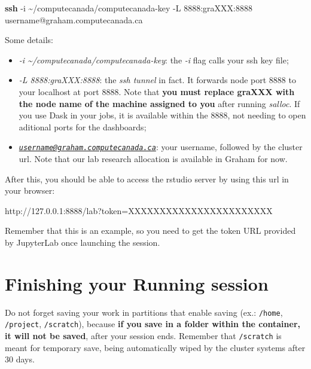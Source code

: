 \documentclass[
]{book}
\newenvironment{Shaded}{\begin{snugshade}}{\end{snugshade}}
\newcommand{\AttributeTok}[1]{\textcolor[rgb]{0.13,0.29,0.53}{#1}}
\newcommand{\ExtensionTok}[1]{#1}
\newcommand{\FunctionTok}[1]{\textcolor[rgb]{0.13,0.29,0.53}{\textbf{#1}}}
\newcommand{\NormalTok}[1]{#1}
\providecommand{\tightlist}{%
  \setlength{\itemsep}{0pt}\setlength{\parskip}{0pt}}
\begin{document}
\begin{Shaded}
\begin{Highlighting}[]
\FunctionTok{ssh} \AttributeTok{{-}i}\NormalTok{ \textasciitilde{}/computecanada/computecanada{-}key }\AttributeTok{{-}L}\NormalTok{ 8888:graXXX:8888 username@graham.computecanada.ca}
\end{Highlighting}
\end{Shaded}

Some details:

\begin{itemize}
\tightlist
\item
  \emph{-i \textasciitilde/computecanada/computecanada-key}: the \emph{-i} flag calls your ssh key file;
\item
  \emph{-L 8888:graXXX:8888}: the \emph{ssh tunnel} in fact. It forwards node port 8888 to your localhost at port 8888. Note that \textbf{you must replace graXXX with the node name of the machine assigned to you} after running \emph{salloc}. If you use Dask in your jobs, it is available within the 8888, not needing to open aditional ports for the dashboards;
\item
  \emph{\href{mailto:username@graham.computecanada.ca}{\nolinkurl{username@graham.computecanada.ca}}}: your username, followed by the cluster url. Note that our lab research allocation is available in Graham for now.
\end{itemize}

After this, you should be able to access the rstudio server by using this url
in your browser:

\begin{Shaded}
\begin{Highlighting}[]
\ExtensionTok{http://127.0.0.1:8888/lab?token=XXXXXXXXXXXXXXXXXXXXXXX}
\end{Highlighting}
\end{Shaded}

Remember that this is an example, so you need to get the token URL provided by JupyterLab once launching the session.

\hypertarget{finishing-your-running-session-1}{%
\section{Finishing your Running session}\label{finishing-your-running-session-1}}

Do not forget saving your work in partitions that enable saving (ex.: \texttt{/home}, \texttt{/project}, \texttt{/scratch}), because \textbf{if you save in a folder within the container, it will not be saved}, after your session ends. Remember that \texttt{/scratch} is meant for temporary save, being automatically wiped by the cluster systems after 30 days.
\end{document}

